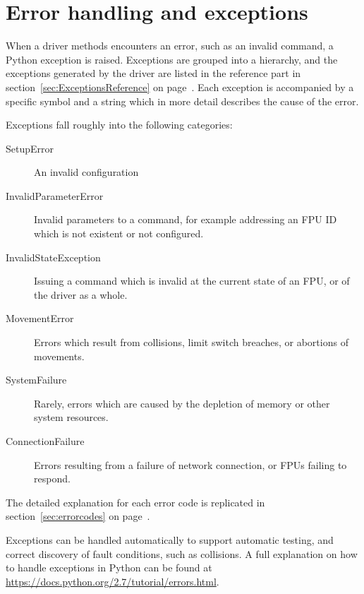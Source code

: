 \documentclass[11pt,a4paper]{scrartcl}
\begin{document}
\section{Error handling and exceptions}
\label{sec:errorhandling}
When a driver methods encounters an error, such as an invalid command,
a Python exception is raised. Exceptions are grouped into a hierarchy,
and the exceptions generated by the driver are listed in the reference
part in section~\ref{sec:ExceptionsReference} on
page~\pageref{sec:ExceptionsReference}. Each exception is accompanied
by a specific symbol and a string which in more detail describes the
cause of the error.

Exceptions fall roughly into the following categories:

\begin{description}
  \item[SetupError] An invalid configuration 
  \item[InvalidParameterError] Invalid parameters to a command, for example addressing an FPU
    ID which is not existent or not configured.
  \item[InvalidStateException] Issuing a command which is invalid at the current state of
    an FPU, or of the driver as a whole.
  \item[MovementError] Errors which result from collisions, limit switch breaches,
    or abortions of movements.
  \item[SystemFailure] Rarely, errors which are caused by the depletion of memory
    or other system resources.
  \item[ConnectionFailure] Errors resulting from a failure of network connection, or FPUs failing to respond.
\end{description}

The detailed explanation for each error code is replicated in
section~\ref{sec:errorcodes} on page~\pageref{sec:errorcodes}.

Exceptions can be handled automatically to support automatic
testing, and correct discovery of fault conditions, such as
collisions. A full explanation on how to handle exceptions in Python can
be found at \url{https://docs.python.org/2.7/tutorial/errors.html}.
\end{document}
